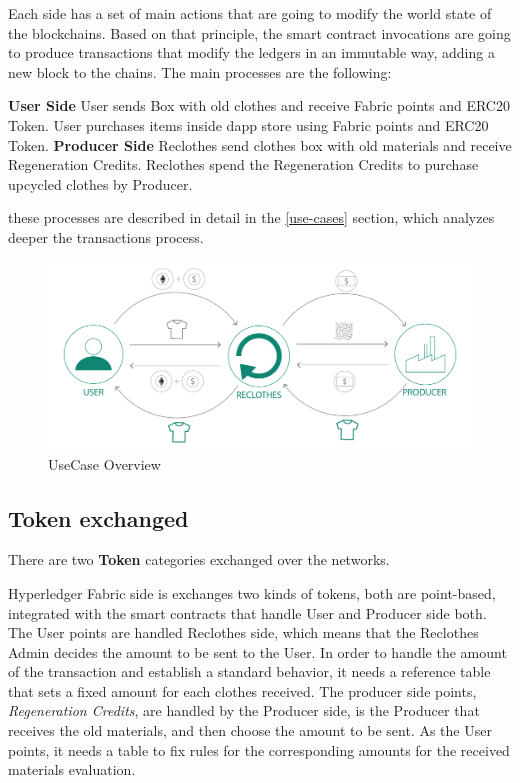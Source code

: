 \bigskip

Each side has a set of main actions that are going to modify the world state of the blockchains.
Based on that principle, the smart contract invocations are going to produce transactions that modify the 
ledgers in an immutable way, adding a new block to the chains. The main processes are the following: 

\begin{outline}[enumerate]
	\1 \textbf{User Side}
    \2 User sends Box with old clothes and receive Fabric points and ERC20 Token.
    \2 User purchases items inside dapp store using Fabric points and ERC20 Token.
    \1 \textbf{Producer Side}
    \2 Reclothes send clothes box with old materials and receive Regeneration Credits.
    \2 Reclothes spend the Regeneration Credits to purchase upcycled clothes by Producer.
\end{outline}

these processes are described in detail in the \ref{use-cases} section, which analyzes 
deeper the transactions process. 

\begin{figure}[h!]
	\centering
	\includegraphics[totalheight=6cm]{img/use-case-schema.png}
	\caption{UseCase Overview}
	\label{fig:schema}
\end{figure}

\subsection{Token exchanged}

There are two \textbf{Token} categories exchanged over the networks. 
\bigskip

Hyperledger Fabric side is exchanges two kinds of tokens, both are point-based, integrated with the smart 
contracts that handle User and Producer side both. The User points are handled Reclothes side, which means that 
the Reclothes Admin decides the amount to be sent to the User. 
In order to handle the amount of the transaction and establish a standard behavior, it needs a reference table that 
sets a fixed amount for each clothes received. The producer side points, \textit{Regeneration Credits}, are 
handled by the Producer side, is the Producer that receives the old materials, and then choose the amount to 
be sent. As the User points, it needs a table to fix rules for the corresponding amounts for the received 
materials evaluation. 
\bigskip

